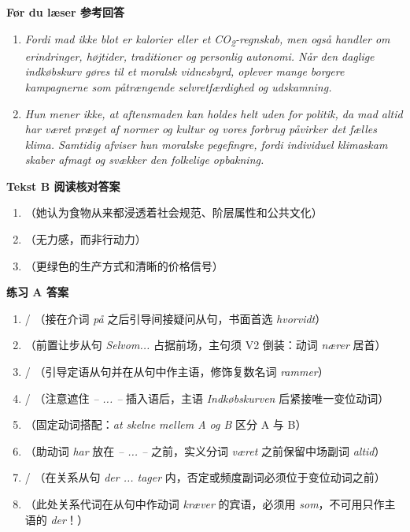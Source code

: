 \begin{answerbox}
\textbf{Før du læser 参考回答}
\begin{enumerate}
  \item \textit{Fordi mad ikke blot er kalorier eller et CO\textsubscript{2}-regnskab, men også handler om erindringer, højtider, traditioner og personlig autonomi. Når den daglige indkøbskurv gøres til et moralsk vidnesbyrd, oplever mange borgere kampagnerne som påtrængende selvretfærdighed og udskamning.}
  \item \textit{Hun mener ikke, at aftensmaden kan holdes helt uden for politik, da mad altid har været præget af normer og kultur og vores forbrug påvirker det fælles klima. Samtidig afviser hun moralske pegefingre, fordi individuel klimaskam skaber afmagt og svækker den folkelige opbakning.}
\end{enumerate}

\textbf{Tekst B 阅读核对答案}
\begin{enumerate}
  \item {}（她认为食物从来都浸透着社会规范、阶层属性和公共文化）
  \item {}（无力感，而非行动力）
  \item {}（更绿色的生产方式和清晰的价格信号）
\end{enumerate}

\textbf{练习 A 答案}
\begin{enumerate}
  \item {} / （接在介词 \textit{på} 之后引导间接疑问从句，书面首选 \textit{hvorvidt}）
  \item {}（前置让步从句 \textit{Selvom...} 占据前场，主句须 V2 倒装：动词 \textit{nærer} 居首）
  \item {} / （引导定语从句并在从句中作主语，修饰复数名词 \textit{rammer}）
  \item {} / （注意遮住 \textit{-- ... --} 插入语后，主语 \textit{Indkøbskurven} 后紧接唯一变位动词）
  \item {}（固定动词搭配：\textit{at skelne mellem A og B} 区分 A 与 B）
  \item {}（助动词 \textit{har} 放在 \textit{-- ... --} 之前，实义分词 \textit{været} 之前保留中场副词 \textit{altid}）
  \item {} / （在关系从句 \textit{der ... tager} 内，否定或频度副词必须位于变位动词之前）
  \item {}（此处关系代词在从句中作动词 \textit{kræver} 的宾语，必须用 \textit{som}，不可用只作主语的 \textit{der}！）
\end{enumerate}


\end{answerbox}
